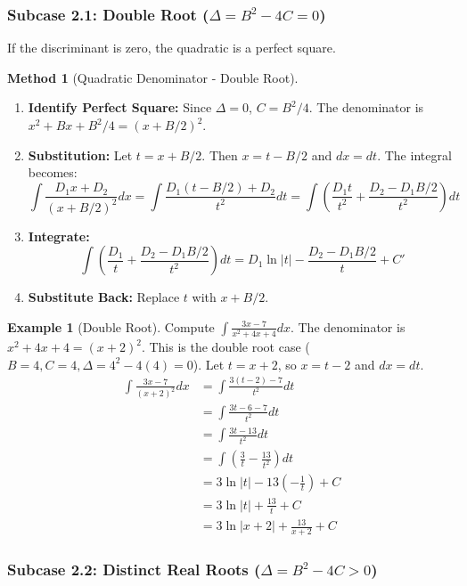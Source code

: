 \documentclass[11pt]{article}
\theoremstyle{plain}
\theoremstyle{definition}
\newtheorem{example}[theorem]{Example}
\newtheorem{method}[theorem]{Method}
\theoremstyle{remark}
\newcommand{\abs}[1]{\left|#1\right|}
\begin{document}
\subsubsection{Subcase 2.1: Double Root ($\Delta = B^2-4C = 0$)}

If the discriminant is zero, the quadratic is a perfect square.

\begin{method}[Quadratic Denominator - Double Root]
\leavevmode
\begin{enumerate}
    \item \textbf{Identify Perfect Square:} Since $\Delta=0$, $C = B^2/4$. The denominator is $x^2+Bx+B^2/4 = (x+B/2)^2$.
    \item \textbf{Substitution:} Let $t = x+B/2$. Then $x=t-B/2$ and $dx=dt$. The integral becomes:
    \[ \int \frac{D_1 x + D_2}{(x+B/2)^2} dx = \int \frac{D_1(t-B/2) + D_2}{t^2} dt = \int \left( \frac{D_1 t}{t^2} + \frac{D_2 - D_1 B/2}{t^2} \right) dt \]
    \item \textbf{Integrate:}
    \[ \int \left( \frac{D_1}{t} + \frac{D_2 - D_1 B/2}{t^2} \right) dt = D_1 \ln\abs{t} - \frac{D_2 - D_1 B/2}{t} + C' \]
    \item \textbf{Substitute Back:} Replace $t$ with $x+B/2$.
\end{enumerate}
\end{method}

\begin{example}[Double Root]
Compute $\int \frac{3x-7}{x^2+4x+4} dx$.
The denominator is $x^2+4x+4 = (x+2)^2$. This is the double root case ($B=4, C=4, \Delta=4^2-4(4)=0$).
Let $t = x+2$, so $x=t-2$ and $dx=dt$.
\begin{align*} \int \frac{3x-7}{(x+2)^2} dx &= \int \frac{3(t-2)-7}{t^2} dt \\ &= \int \frac{3t - 6 - 7}{t^2} dt \\ &= \int \frac{3t - 13}{t^2} dt \\ &= \int \left( \frac{3}{t} - \frac{13}{t^2} \right) dt \\ &= 3 \ln\abs{t} - 13 \left( -\frac{1}{t} \right) + C \\ &= 3 \ln\abs{t} + \frac{13}{t} + C \\ &= 3 \ln\abs{x+2} + \frac{13}{x+2} + C \end{align*}
\end{example}

\subsubsection{Subcase 2.2: Distinct Real Roots ($\Delta = B^2-4C > 0$)}
\end{document}
